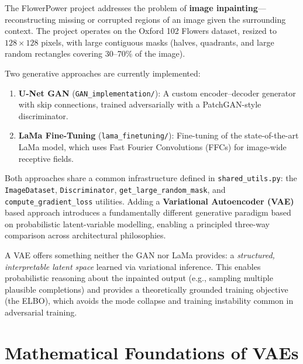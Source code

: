 \documentclass[11pt, a4paper]{article}
\begin{document}
The FlowerPower project addresses the problem of \textbf{image inpainting}---reconstructing missing or corrupted regions of an image given the surrounding context. The project operates on the Oxford 102 Flowers dataset, resized to \(128 \times 128\) pixels, with large contiguous masks (halves, quadrants, and large random rectangles covering 30--70\% of the image).

Two generative approaches are currently implemented:

\begin{enumerate}[leftmargin=2em]
  \item \textbf{U-Net GAN} (\texttt{GAN\_implementation/}): A custom encoder--decoder generator with skip connections, trained adversarially with a PatchGAN-style discriminator.
  \item \textbf{LaMa Fine-Tuning} (\texttt{lama\_finetuning/}): Fine-tuning of the state-of-the-art LaMa model, which uses Fast Fourier Convolutions (FFCs) for image-wide receptive fields.
\end{enumerate}

Both approaches share a common infrastructure defined in \texttt{shared\_utils.py}: the \texttt{ImageDataset}, \texttt{Discriminator}, \texttt{get\_large\_random\_mask}, and \texttt{compute\_gradient\_loss} utilities. Adding a \textbf{Variational Autoencoder (VAE)} based approach introduces a fundamentally different generative paradigm based on probabilistic latent-variable modelling, enabling a principled three-way comparison across architectural philosophies.

\begin{keyinsight}
A VAE offers something neither the GAN nor LaMa provides: a \emph{structured, interpretable latent space} learned via variational inference. This enables probabilistic reasoning about the inpainted output (e.g., sampling multiple plausible completions) and provides a theoretically grounded training objective (the ELBO), which avoids the mode collapse and training instability common in adversarial training.
\end{keyinsight}


\section{Mathematical Foundations of VAEs}
\label{sec:vae_foundations}
\end{document}
